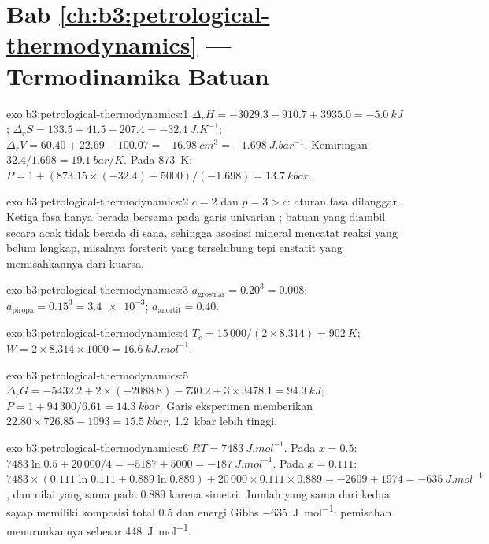 \section*{Bab \ref{ch:b3:petrological-thermodynamics} --- Termodinamika Batuan}

\begin{solution}{exo:b3:petrological-thermodynamics:1}
$\Delta_rH = -3029.3 - 910.7 + 3935.0 = \qty{-5.0}{kJ}$; $\Delta_rS = 133.5 +
41.5 - 207.4 = \qty{-32.4}{J.K^{-1}}$; $\Delta_rV = 60.40 + 22.69 - 100.07 =
\qty{-16.98}{cm^3} = \qty{-1.698}{J.bar^{-1}}$. Kemiringan $32.4/1.698 =
\qty{19.1}{bar/K}$. Pada \qty{873}{K}: $P = 1 + (873.15\times(-32.4) +
5000)/(-1.698) = \qty{13.7}{kbar}$.
\end{solution}

\begin{solution}{exo:b3:petrological-thermodynamics:2}
$c = 2$ dan $p = 3 > c$: aturan fasa dilanggar. Ketiga fasa hanya berada bersama pada
garis univarian ; batuan yang diambil
secara acak tidak berada di sana, sehingga asosiasi mineral mencatat reaksi yang belum lengkap, misalnya
forsterit yang terselubung tepi enstatit yang memisahkannya dari
kuarsa.
\end{solution}

\begin{solution}{exo:b3:petrological-thermodynamics:3}
$a_{\text{grosular}} = 0.20^3 = 0.008$; $a_{\text{piropa}} = 0.15^3 =
\num{3.4e-3}$; $a_{\text{anortit}} = 0.40$.
\end{solution}

\begin{solution}{exo:b3:petrological-thermodynamics:4}
$T_c = 15\,000/(2\times8.314) = \qty{902}{K}$; $W = 2\times8.314\times1000
= \qty{16.6}{kJ.mol^{-1}}$.
\end{solution}

\begin{solution}{exo:b3:petrological-thermodynamics:5}
$\Delta_rG = -5432.2 + 2\times(-2088.8) - 730.2 + 3\times3478.1 =
\qty{94.3}{kJ}$; $P = 1 + 94\,300/6.61 = \qty{14.3}{kbar}$. Garis eksperimen
memberikan $22.80\times726.85 - 1093 = \qty{15.5}{kbar}$, \qty{1.2}{kbar}
lebih tinggi.
\end{solution}

\begin{solution}{exo:b3:petrological-thermodynamics:6}
$RT = \qty{7483}{J.mol^{-1}}$. Pada $x = 0.5$: $7483\ln0.5 + 20\,000/4 = -5187 +
5000 = \qty{-187}{J.mol^{-1}}$. Pada $x = 0.111$: $7483\times(0.111\ln0.111 +
0.889\ln0.889) + 20\,000\times0.111\times0.889 = -2609 + 1974 =
\qty{-635}{J.mol^{-1}}$, dan nilai yang sama pada 0.889 karena simetri. Jumlah yang sama dari
kedua sayap memiliki komposisi total 0.5 dan energi Gibbs
\qty{-635}{J.mol^{-1}}: pemisahan menurunkannya sebesar \qty{448}{J.mol^{-1}}.
\end{solution}


